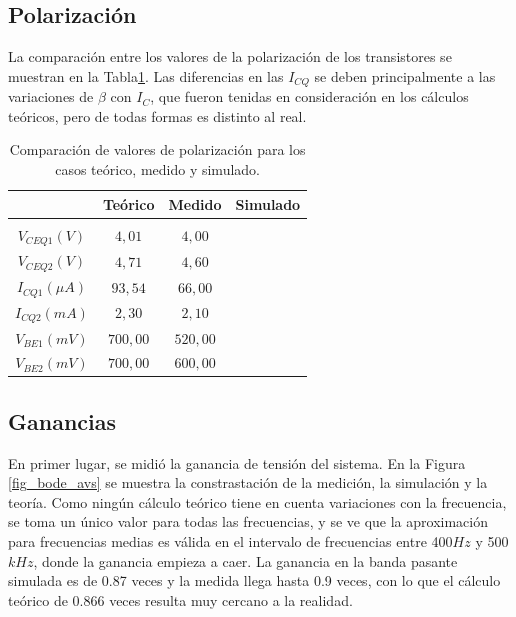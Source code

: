 \subsection{Polarización}
La comparación entre los valores de la polarización de los transistores se muestran en la Tabla\ref{tabla_polarizacion_comp}. Las diferencias en las $I_{CQ}$ se deben principalmente a las variaciones de $\beta$ con $I_{C}$, que fueron tenidas en consideración en los cálculos teóricos, pero de todas formas es distinto al real.


	\begin{table}[h!]
	\centering
	\begin{tabular}{c c c c}%
		\bfseries &Te\'orico & Medido & Simulado \\ \hline \\
		$V_{CEQ1} (V)$ & $4,01$ &$4,00$ & \\
		$V_{CEQ2} (V)$ & $4,71$& $4,60$& \\
		$I_{CQ1} (\mu A)$ & $93,54$&$66,00$ & \\
		$I_{CQ2} (mA)$ &$2,30$ & $2,10$& \\
		$V_{BE1} (mV)$ &$700,00$ &$520,00$ & \\
		$V_{BE2} (mV)$ & $700,00$& $600,00$& \\
		\hline
	\end{tabular}
	\caption{Comparaci\'on de valores de polarizaci\'on para los casos te\'orico, medido y simulado.}
	\label{tabla_polarizacion_comp}
\end{table}

\subsection{Ganancias}
En primer lugar, se midió la ganancia de tensión del sistema. En la Figura \ref{fig_bode_avs} se muestra la constrastación de la medición, la simulación y la teoría. Como ningún cálculo teórico tiene en cuenta variaciones con la frecuencia, se toma un único valor para todas las frecuencias, y se ve que la aproximación para frecuencias medias es válida en el intervalo de frecuencias entre 400$Hz$ y 500$kHz$, donde la ganancia empieza a caer. La ganancia en la banda pasante simulada es de 0.87 veces y la medida llega hasta 0.9 veces, con lo que el cálculo teórico de 0.866 veces resulta muy cercano a la realidad.

